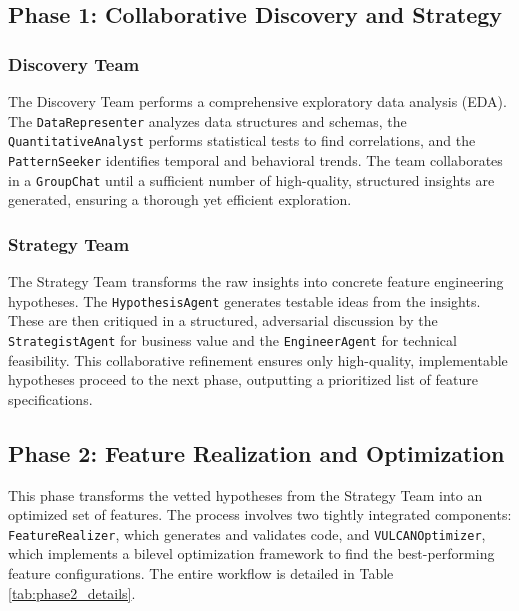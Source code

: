 \subsection{Phase 1: Collaborative Discovery and Strategy}

\subsubsection{Discovery Team}

The Discovery Team performs a comprehensive exploratory data analysis (EDA). The \texttt{DataRepresenter} analyzes data structures and schemas, the \texttt{QuantitativeAnalyst} performs statistical tests to find correlations, and the \texttt{PatternSeeker} identifies temporal and behavioral trends. The team collaborates in a \texttt{GroupChat} until a sufficient number of high-quality, structured insights are generated, ensuring a thorough yet efficient exploration.

\subsubsection{Strategy Team}

The Strategy Team transforms the raw insights into concrete feature engineering hypotheses. The \texttt{HypothesisAgent} generates testable ideas from the insights. These are then critiqued in a structured, adversarial discussion by the \texttt{StrategistAgent} for business value and the \texttt{EngineerAgent} for technical feasibility. This collaborative refinement ensures only high-quality, implementable hypotheses proceed to the next phase, outputting a prioritized list of feature specifications.



\subsection{Phase 2: Feature Realization and Optimization}

This phase transforms the vetted hypotheses from the Strategy Team into an optimized set of features. The process involves two tightly integrated components: \texttt{FeatureRealizer}, which generates and validates code, and \texttt{VULCANOptimizer}, which implements a bilevel optimization framework to find the best-performing feature configurations. The entire workflow is detailed in Table \ref{tab:phase2_details}.

